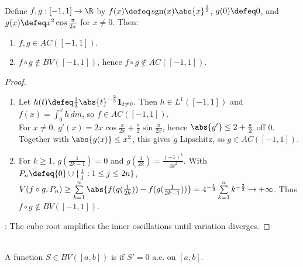 \begin{example} \label{ex:absolute-continuity-composition-can-fail-bv} \\
Define $f,g:[-1,1]\to\R$ by $f(x)\defeq\operatorname{sgn}(x)\abs{x}^{\frac{1}{3}}$, $g(0)\defeq0$, and $g(x)\defeq x^2\cos\frac{\pi}{2x}$ for $x\neq0$. Then:
\begin{enumerate}[label=(\roman*)]
\setlength{\itemsep}{0pt}
\item $f,g\in AC([-1,1])$.
\item $f\circ g\notin BV([-1,1])$, hence $f\circ g\notin AC([-1,1])$.
\end{enumerate}
\begin{proof}
\begin{enumerate}[label=(\roman*)]
\setlength{\itemsep}{0pt}
\item Let $h(t)\defeq\frac{1}{3}\abs{t}^{-\frac{2}{3}}\mathbf{1}_{t\neq0}$. Then $h\in L^1([-1,1])$ and $f(x)=\int_0^xh\,dm$, so $f\in AC([-1,1])$.\\
For $x\neq0$, $g'(x)=2x\cos\frac{\pi}{2x}+\frac{\pi}{2}\sin\frac{\pi}{2x}$, hence $\abs{g'}\leq2+\frac{\pi}{2}$ off $0$.\\
Together with $\abs{g(x)}\leq x^2$, this gives $g$ Lipschitz, so $g\in AC([-1,1])$.
\item For $k\geq1$, $g(\frac{1}{2k-1})=0$ and $g(\frac{1}{2k})=\frac{(-1)^k}{4k^2}$. With $P_n\defeq\{0\}\cup\{\frac{1}{j}:1\leq j\leq2n\}$,\\
$V(f\circ g,P_n)\geq\sum\limits_{k=1}^n\abs{f(g(\frac{1}{2k}))-f(g(\frac{1}{2k-1}))}=4^{-\frac{1}{3}}\sum\limits_{k=1}^nk^{-\frac{2}{3}}\to+\infty$. Thus $f\circ g\notin BV([-1,1])$.
\end{enumerate}
: The cube root amplifies the inner oscillations until variation diverges.
\end{proof}
\end{example}

\begin{definition} \label{def:singular-bounded-variation-function} \\
A function $S\in BV([a,b])$ is  if $S'=0$ a.e. on $[a,b]$.
\end{definition}

